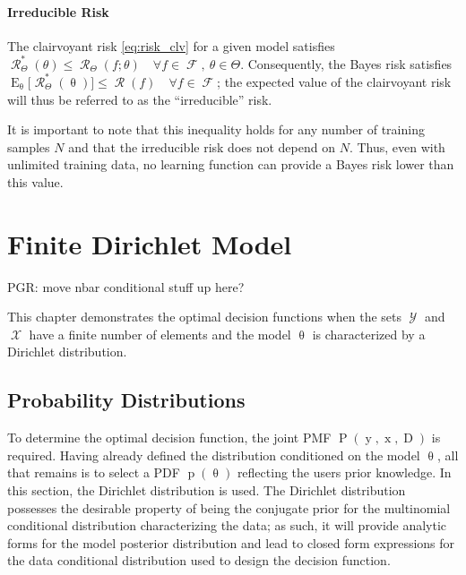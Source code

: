 \documentclass[12pt]{report}
\DeclareMathOperator{\xrm}{\mathrm{x}}
\DeclareMathOperator{\yrm}{\mathrm{y}}
\DeclareMathOperator{\Drm}{\mathrm{D}}
\DeclareMathOperator{\Prm}{\mathrm{P}}
\DeclareMathOperator{\prm}{\mathrm{p}}
\DeclareMathOperator{\Erm}{\mathrm{E}}
\DeclareMathOperator{\Xcal}{\mathcal{X}}
\DeclareMathOperator{\Ycal}{\mathcal{Y}}
\DeclareMathOperator{\Fcal}{\mathcal{F}}
\DeclareMathOperator{\Rcal}{\mathcal{R}}
\begin{document}
\subsubsection{Irreducible Risk}

The clairvoyant risk \eqref{eq:risk_clv} for a given model satisfies $\Rcal_{\Theta}^*(\theta) \leq \Rcal_{\Theta}(f;\theta) \quad \forall f \in \Fcal, \ \theta \in \Theta$. Consequently, the Bayes risk satisfies $\Erm_{\uptheta} \big[ \Rcal_{\Theta}^*(\uptheta) \big] \leq \Rcal(f) \quad \forall f \in \Fcal$; the expected value of the clairvoyant risk will thus be referred to as the ``irreducible'' risk. 

It is important to note that this inequality holds for any number of training samples $N$ and that the irreducible risk does not depend on $N$. Thus, even with unlimited training data, no learning function can provide a Bayes risk lower than this value.











\chapter{Finite Dirichlet Model}

PGR: move nbar conditional stuff up here?


This chapter demonstrates the optimal decision functions when the sets $\Ycal$ and $\Xcal$ have a finite number of elements and the model $\uptheta$ is characterized by a Dirichlet distribution.


\section{Probability Distributions}

To determine the optimal decision function, the joint PMF $\Prm(\yrm,\xrm,\Drm)$ is required. Having already defined the distribution conditioned on the model $\uptheta$, all that remains is to select a PDF $\prm(\uptheta)$ reflecting the users prior knowledge. In this section, the Dirichlet distribution is used. The Dirichlet distribution possesses the desirable property of being the conjugate prior for the multinomial conditional distribution characterizing the data; as such, it will provide analytic forms for the model posterior distribution and lead to closed form expressions for the data conditional distribution used to design the decision function.
\end{document}
